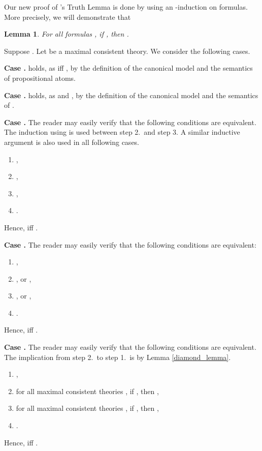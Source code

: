 \documentclass{article}[12pt]
\newtheorem{lemma}{Lemma}
\newenvironment{proof}{\noindent {\bf Proof \ }}{\hfill ~}
\newcommand{\hans}[1]{}
\begin{document}
Our new proof of 's Truth Lemma is done by using an -induction on formulas.
More precisely, we will demonstrate that

\begin{lemma}\label{induction_bb}
For all formulas , if , then .
\end{lemma}
\begin{proof}
Suppose .
Let  be a maximal consistent theory.
We consider the following  cases.


\medskip \noindent 
{\bf Case .}
\hans{Chang\'e}  holds, as  iff , by the definition of the canonical model and the semantics of propositional atoms. 

\medskip  \noindent 
{\bf Case .}
 holds, as  and , by the definition of the canonical model and the semantics of . 

\medskip  \noindent 
{\bf Case .}
The reader may easily verify that the following conditions are equivalent.
The induction using  is used between step 2.\ and step 3. A similar inductive argument is also used in all following cases. 
\begin{enumerate}
\item ,
\item ,
\item ,
\item .
\end{enumerate}
Hence,  iff .


\medskip \noindent 
{\bf Case .}
The reader may easily verify that the following conditions are equivalent:
\begin{enumerate}
\item ,
\item , or ,
\item , or ,
\item .
\end{enumerate}
Hence,  iff .


\medskip \noindent 
{\bf Case .} The reader may easily verify that the following conditions are equivalent.
The implication from step 2.\ to step 1.\ is by Lemma \ref{diamond_lemma}.
\begin{enumerate}
\item ,
\item for all maximal consistent theories , if , then ,
\item for all maximal consistent theories , if , then ,
\item .
\end{enumerate}
Hence,  iff .


\medskip




\end{proof}
\end{document}
